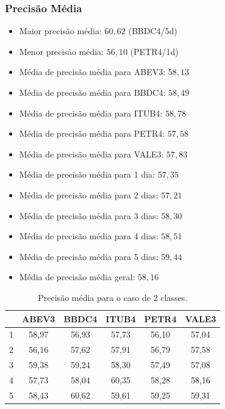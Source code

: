 \documentclass[grad,numbers]{coppe}
\begin{document}
	 			\subsubsection{Precisão Média}
					\begin{itemize}
		 				\item Maior precisão média: $60,62$ (BBDC4/5d)
		 				\item Menor precisão média: $56,10$ (PETR4/1d)
		 				\item Média de precisão média para ABEV3: $58,13$
		 				\item Média de precisão média para BBDC4: $58,49$
		 				\item Média de precisão média para ITUB4: $58,78$
		 				\item Média de precisão média para PETR4: $57,58$
		 				\item Média de precisão média para VALE3: $57,83$
		 				\item Média de precisão média para 1 dia: $57,35$
		 				\item Média de precisão média para 2 dias: $57,21$
		 				\item Média de precisão média para 3 dias: $58,30$
		 				\item Média de precisão média para 4 dias: $58,51$
		 				\item Média de precisão média para 5 dias: $59,44$
		 				\item Média de precisão média geral: $58,16$
		 			\end{itemize}
		 			\begin{table}[h]
		 				\caption{Precisão média para o caso de 2 classes.}
		 				\label{tab:2c_pr_analysis}
		 				\centering
		 				{\footnotesize
		 					\begin{tabular}{|c|c|c|c|c|c|}
		 						\hline
		 						\diagbox[linewidth=0.2pt, width=\dimexpr \textwidth/10+2\tabcolsep\relax, height=0.8cm]{Dias}{Ativo}
		 						& ABEV3 & BBDC4 & ITUB4 & PETR4 & VALE3\\
		 						\hline
		 						1 & 58,97 & 56,93 & 57,73 & 56,10 & 57,04 \\
		 						2 & 56,16 & 57,62 & 57,91 & 56,79 & 57,58 \\
		 						3 & 59,38 & 59,24 & 58,30 & 57,49 & 57,08 \\
		 						4 & 57,73 & 58,04 & 60,35 & 58,28 & 58,16 \\
		 						5 & 58,43 & 60,62 & 59,61 & 59,25 & 59,31 \\
		 						\hline
		 				\end{tabular}}
		 			\end{table}
	 			\newpage
\end{document}
